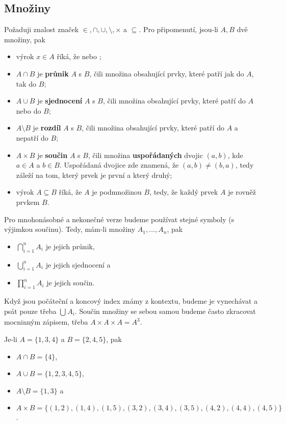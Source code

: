 \subsection{Množiny}
\label{ssec:mnoziny}

Požaduji znalost značek $ \in,  \cap,  \cup ,  \setminus ,  \times $ a $
\subseteq $. Pro připomenutí, jsou-li $A,B$ dvě množiny, pak
\begin{itemize}
 \item výrok $x \in A$ říká, že  nebo ;
 \item  $A \cap B$ je \textbf{průnik} $A$ s $B$, čili množina obsahující
  prvky, které patří jak do $A$, tak do $B$;
 \item $A \cup B$ je \textbf{sjednocení} $A$ s $B$, čili množina obsahující
  prvky, které patří do $A$ nebo do $B$;
 \item $A \setminus B$ je \textbf{rozdíl} $A$ s $B$, čili množina obsahující
  prvky, které patří do $A$ a nepatří do $B$;
 \item $A \times B$ je \textbf{součin} $A$ s $B$, čili množina
  \textbf{uspořádaných} dvojic $(a,b)$, kde $a \in A$ a $b \in B$. Uspořádaná
  dvojice zde znamená, že $(a,b) \neq (b,a)$, tedy záleží na tom, který prvek
  je první a který druhý;
 \item výrok $A \subseteq B$ říká, že $A$ je podmnožinou $B$, tedy, že každý
  prvek $A$ je rovněž prvkem $B$.
\end{itemize}

Pro mnohonásobné a nekonečné verze budeme používat stejné symboly (s výjimkou
součinu). Tedy, mám-li množiny $A_1,\ldots,A_n$, pak
\begin{itemize}
 \item $\bigcap_{i=1}^{n} A_i$ je jejich průnik,
 \item $\bigcup_{i=1}^{n} A_i$ je jejich sjednocení a
 \item $\prod_{i=1}^{n} A_i$ je jejich součin.
\end{itemize}

Když jsou počáteční a koncový index známy z kontextu, budeme je vynechávat a
psát pouze třeba $\bigcup_{}^{} A_i$. Součin množiny se sebou samou budeme často
zkracovat mocninným zápisem, třeba $A \times A \times A = A^3$.

\begin{example}
 Je-li $A = \{1, 3, 4\}$ a $B = \{2, 4, 5\}$, pak
 \begin{itemize}
  \item $A \cap B = \{4\}$,
  \item $A \cup B = \{1, 2, 3, 4, 5\}$, 
  \item $A \setminus B = \{1, 3\}$ a
  \item $A \times B = \{(1, 2), (1, 4), (1, 5), (3, 2), (3, 4), (3, 5), (4, 2),
   (4, 4), (4, 5)\}$.
 \end{itemize}
\end{example}

